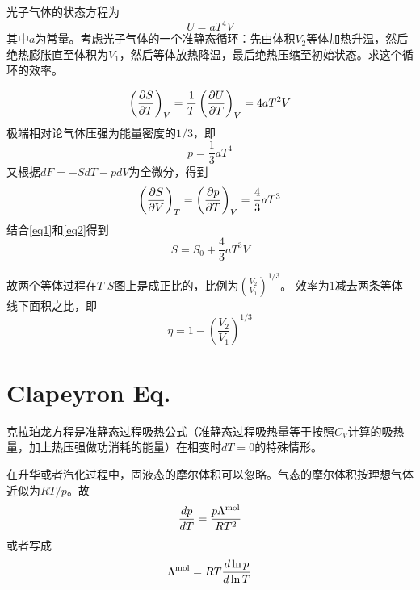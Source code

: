 \documentclass[CJK]{beamer}
\begin{document}
\begin{frame}
  \chtitle{\proid (\sfour)}
  \bch
  光子气体的状态方程为
  $$ U = a T^4 V$$
  其中$a$为常量。考虑光子气体的一个准静态循环：先由体积$V_2$等体加热升温，然后绝热膨胀直至体积为$V_1$，然后等体放热降温，最后绝热压缩至初始状态。求这个循环的效率。
  \ech
\end{frame}


\begin{frame}
  \bch
  {\scriptsize

\begin{equation}
    \left(\frac{\partial S}{\partial T}\right)_{V} = \frac{1}{T}\left(\frac{\partial U}{\partial T}\right)_{V} = 4aT^2 V \label{eq1}
\end{equation}
极端相对论气体压强为能量密度的$1/3$，即
$$p = \frac{1}{3}aT^4$$
又根据$ dF = -SdT - pdV$为全微分，得到
\begin{equation}
  \left(\frac{\partial S}{\partial V}\right)_{T} = \left(\frac{\partial p}{\partial T}\right)_{V} = \frac{4}{3}aT^3 \label{eq2}
\end{equation}
  结合\eqref{eq1}和\eqref{eq2}得到
  $$ S = S_0 + \frac{4}{3} aT^3 V $$
  
  故两个等体过程在$T$-$S$图上是成正比的，比例为$\left(\frac{V_2}{V_1}\right)^{1/3}$。
  效率为$1$减去两条等体线下面积之比，即
  $$\eta = 1 - \left(\frac{V_2}{V_1}\right)^{1/3}$$
  }
  \ech
\end{frame}


\section{Clapeyron Eq.}
\setcounter{chap}{5}
\setcounter{problem}{0}

\begin{frame}
  \bch
  \emini
  克拉珀龙方程是准静态过程吸热公式（准静态过程吸热量等于按照$C_V$计算的吸热量，加上热压强做功消耗的能量）在相变时$dT=0$的特殊情形。
  \emini
  
  \ech
\end{frame}

\begin{frame}
  \bch
  在升华或者汽化过程中，固液态的摩尔体积可以忽略。气态的摩尔体积按理想气体近似为$RT/p$。故
  $$ \frac{dp}{dT} = \frac{p\Lambda^{\rm mol}}{RT^2}$$
  或者写成
{\blue  $$ \Lambda^{\rm mol} = RT \frac{d \ln p}{d \ln T} $$}
  \ech
\end{frame}
\end{document}
